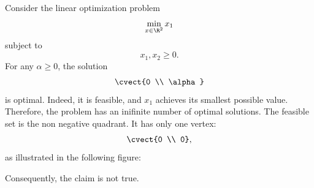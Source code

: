 

Consider the linear optimization problem
\[
\min_{x \in \R^2} x_1
\]
subject to
\[
x_1, x_2 \geq 0.
\]
For any $\alpha \geq 0$, the solution
\[
\cvect{0 \\ \alpha}
\]
is optimal. Indeed, it is feasible, and $x_1$ achieves its smallest
possible value. Therefore, the problem has an inifinite number of
optimal solutions. 
The feasible set is the non negative quadrant. It has only one vertex:
\[
\cvect{0 \\ 0},
\]
as illustrated in the following figure: 
\begin{center}
\end{center}
Consequently, the claim is not true. 

